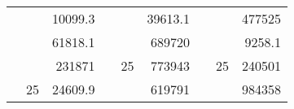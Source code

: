 \begin{table}[]
\begin{tabular}{|ccrccrccc}
\rowcolor[HTML]{DAE8FC} 
\multicolumn{1}{|c|}{\cellcolor[HTML]{FFFFC7}}                                & \multicolumn{1}{c|}{\cellcolor[HTML]{DAE8FC}}                      & \multicolumn{1}{r|}{\cellcolor[HTML]{DAE8FC}10099.3}   & \multicolumn{1}{c|}{\cellcolor[HTML]{FFFFC7}}                                & \multicolumn{1}{c|}{\cellcolor[HTML]{DAE8FC}}                       & \multicolumn{1}{r|}{\cellcolor[HTML]{DAE8FC}39613.1}   & \multicolumn{1}{c|}{\cellcolor[HTML]{FFFFC7}}                                & \multicolumn{1}{c|}{\cellcolor[HTML]{DAE8FC}}                      & \multicolumn{1}{r|}{\cellcolor[HTML]{DAE8FC}477525}    \\ \cline{3-3} \cline{6-6} \cline{9-9} 
\multicolumn{1}{|c|}{\cellcolor[HTML]{FFFFC7}}                                & \multicolumn{1}{c|}{\cellcolor[HTML]{DAE8FC}}                      & \multicolumn{1}{r|}{\cellcolor[HTML]{DDFDFF}61818.1}   & \multicolumn{1}{c|}{\cellcolor[HTML]{FFFFC7}}                                & \multicolumn{1}{c|}{\cellcolor[HTML]{DAE8FC}}                       & \multicolumn{1}{r|}{\cellcolor[HTML]{DDFDFF}689720}    & \multicolumn{1}{c|}{\cellcolor[HTML]{FFFFC7}}                                & \multicolumn{1}{c|}{\cellcolor[HTML]{DAE8FC}}                      & \multicolumn{1}{r|}{\cellcolor[HTML]{DDFDFF}9258.1}    \\ \cline{3-3} \cline{6-6} \cline{9-9} 
\rowcolor[HTML]{DAE8FC} 
\multicolumn{1}{|c|}{\cellcolor[HTML]{FFFFC7}}                                & \multicolumn{1}{c|}{\cellcolor[HTML]{DAE8FC}}                      & \multicolumn{1}{r|}{\cellcolor[HTML]{DAE8FC}231871}    & \multicolumn{1}{c|}{\cellcolor[HTML]{FFFFC7}}                                & \multicolumn{1}{c|}{\multirow{-9}{*}{\cellcolor[HTML]{DAE8FC}25}}   & \multicolumn{1}{r|}{\cellcolor[HTML]{DAE8FC}773943}    & \multicolumn{1}{c|}{\cellcolor[HTML]{FFFFC7}}                                & \multicolumn{1}{c|}{\multirow{-9}{*}{\cellcolor[HTML]{DAE8FC}25}}  & \multicolumn{1}{r|}{\cellcolor[HTML]{DAE8FC}240501}    \\ \cline{3-3} \cline{5-6} \cline{8-9} 
\multicolumn{1}{|c|}{\cellcolor[HTML]{FFFFC7}}                                & \multicolumn{1}{c|}{\multirow{-10}{*}{\cellcolor[HTML]{DAE8FC}25}} & \multicolumn{1}{r|}{\cellcolor[HTML]{DDFDFF}24609.9}   & \multicolumn{1}{c|}{\cellcolor[HTML]{FFFFC7}}                                & \multicolumn{1}{c|}{\cellcolor[HTML]{DDFDFF}}                       & \multicolumn{1}{r|}{\cellcolor[HTML]{DAE8FC}619791}    & \multicolumn{1}{c|}{\cellcolor[HTML]{FFFFC7}}                                & \multicolumn{1}{c|}{\cellcolor[HTML]{DDFDFF}}                      & \multicolumn{1}{r|}{\cellcolor[HTML]{DAE8FC}984358}    \\ \cline{2-3} \cline{6-6} \cline{9-9} 

\end{tabular}
\end{table}
